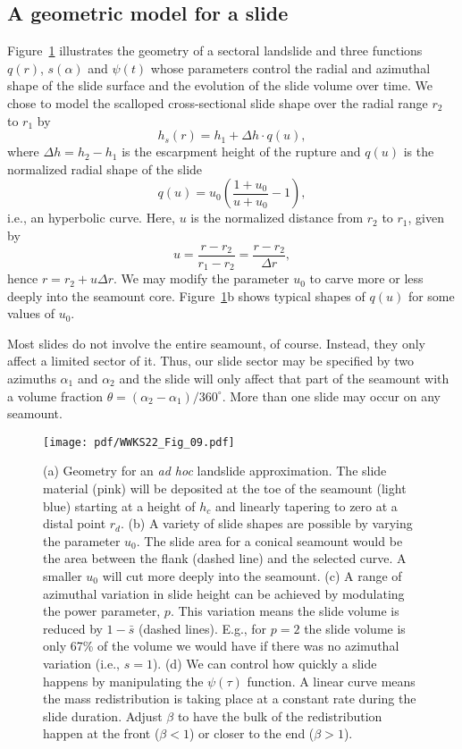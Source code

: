 \subsection{A geometric model for a slide}

Figure~\ref{WWKS22_Fig_09} illustrates the geometry of a sectoral landslide and three functions $q(r)$, $s(\alpha)$ and $\psi(t)$ whose
parameters control the radial and azimuthal shape of the slide surface and the evolution of the slide volume over time.
We chose to model the scalloped cross-sectional slide shape over the radial range $r_2$ to $r_1$ by
\begin{equation}
h_s(r) = h_1 + \Delta h \cdot q(u),
\end{equation}
where $\Delta h = h_2 - h_1$ is the escarpment height of the rupture and $q(u)$ is the normalized radial shape
of the slide
\begin{equation}
q(u) = u_0 \left (\frac{1 + u_0}{u + u_0} - 1 \right ),
\end{equation}
i.e., an hyperbolic curve.  Here, $u$ is the normalized distance from $r_2$ to $r_1$, given by
\begin{equation}
u = \frac{r-r_2}{r_1 - r_2} = \frac{r-r_2}{\Delta r},
\end{equation}
hence $r = r_2 + u \Delta r$. We may modify the parameter $u_0$ to carve more or less deeply
into the seamount core. Figure~\ref{WWKS22_Fig_09}b shows typical shapes of $q(u)$ for some values of $u_0$.

Most slides do not involve the entire seamount, of course. Instead, they only affect a limited sector of it.
Thus, our slide sector may be specified by two azimuths $\alpha_1$ and $\alpha_2$ and the slide will only affect
that part of the seamount with a volume fraction $\theta = (\alpha_2 - \alpha_1)/360^{\circ}$.  More than one slide may
occur on any seamount.

\begin{figure}
\centering
\texttt{[image: pdf/WWKS22\_Fig\_09.pdf]}
\caption{(a) Geometry for an \emph{ad hoc} landslide approximation.  The slide material (pink)
  will be deposited at the toe of the seamount (light blue) starting at a height of $h_c$ and linearly
  tapering to zero at a distal point $r_d$.
  (b) A variety of slide shapes are possible by varying the parameter $u_0$.  The slide area for a conical seamount
  would be the area between the flank (dashed line) and the selected curve. A smaller $u_0$ will cut more deeply
  into the seamount.
  (c) A range of azimuthal variation in slide height can be achieved by modulating the power parameter, $p$.
  This variation means the slide volume is reduced by $1 - \bar{s}$ (dashed lines). E.g., for $p = 2$ the slide
  volume is only 67\% of the volume we would have if there was no azimuthal variation (i.e., $s = 1$).
  (d) We can control how quickly a slide happens by manipulating the $\psi(\tau)$ function. A
  linear curve means the mass redistribution is taking place at a constant rate during the slide duration.
  Adjust $\beta$ to have the bulk of the redistribution happen at the front ($\beta < 1$) or closer
  to the end ($\beta > 1$).}
\label{WWKS22_Fig_09}
\end{figure}


